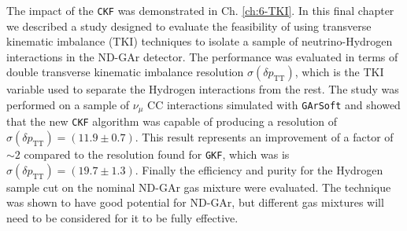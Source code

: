 The impact of the \texttt{CKF} was demonstrated in Ch. \ref{ch:6-TKI}. In this final chapter we described a study designed to evaluate the feasibility of using transverse kinematic imbalance (TKI) techniques to isolate a sample of neutrino-Hydrogen interactions in the ND-GAr detector. The performance was evaluated in terms of double transverse kinematic imbalance resolution $\sigma(\delta p_\text{TT})$, which is the TKI variable used to separate the Hydrogen interactions from the rest. The study was performed on a sample of $\nu_\mu$ CC interactions simulated with \texttt{GArSoft} and showed that the new \texttt{CKF} algorithm was capable of producing a resolution of $\sigma(\delta p_\text{TT})=(11.9\pm0.7)$. This result represents an improvement of a factor of $\sim 2$ compared to the resolution found for \texttt{GKF}, which was is  $\sigma(\delta p_\text{TT})=(19.7\pm1.3)$. Finally the efficiency and purity for the Hydrogen sample cut on the nominal ND-GAr gas mixture were evaluated. The technique was shown to have good potential for ND-GAr, but different gas mixtures will need to be considered for it to be fully effective. 

